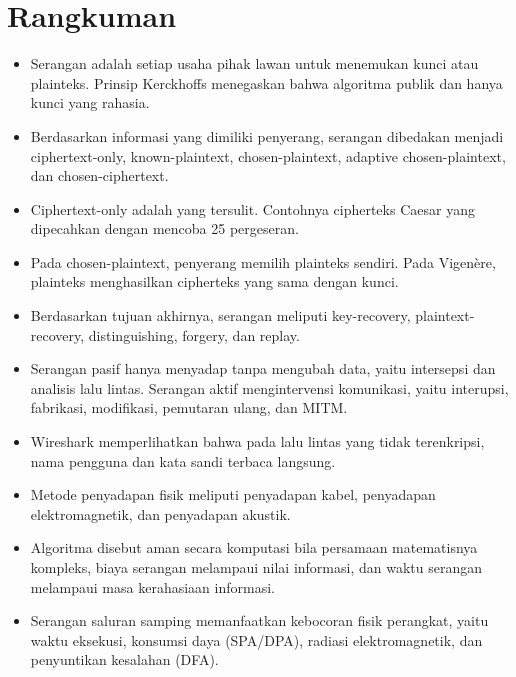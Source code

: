 \section{Rangkuman}
\begin{itemize}
    \item Serangan adalah setiap usaha pihak lawan untuk menemukan kunci atau
          plainteks. Prinsip Kerckhoffs menegaskan bahwa algoritma publik dan
          hanya kunci yang rahasia.
    \item Berdasarkan informasi yang dimiliki penyerang, serangan dibedakan
          menjadi ciphertext-only, known-plaintext, chosen-plaintext, adaptive
          chosen-plaintext, dan chosen-ciphertext.
    \item Ciphertext-only adalah yang tersulit. Contohnya cipherteks Caesar
           yang dipecahkan dengan mencoba 25 pergeseran.
    \item Pada chosen-plaintext, penyerang memilih plainteks sendiri. Pada
          Vigen\`ere, plainteks  menghasilkan cipherteks yang sama
          dengan kunci.
    \item Berdasarkan tujuan akhirnya, serangan meliputi key-recovery,
          plaintext-recovery, distinguishing, forgery, dan replay.
    \item Serangan pasif hanya menyadap tanpa mengubah data, yaitu intersepsi dan
          analisis lalu lintas. Serangan aktif mengintervensi komunikasi, yaitu
          interupsi, fabrikasi, modifikasi, pemutaran ulang, dan MITM.
    \item Wireshark memperlihatkan bahwa pada lalu lintas yang tidak terenkripsi,
          nama pengguna dan kata sandi terbaca langsung.
    \item Metode penyadapan fisik meliputi penyadapan kabel, penyadapan
          elektromagnetik, dan penyadapan akustik.
    \item Algoritma disebut aman secara komputasi bila persamaan matematisnya
          kompleks, biaya serangan melampaui nilai informasi, dan waktu serangan
          melampaui masa kerahasiaan informasi.
    \item Serangan saluran samping memanfaatkan kebocoran fisik perangkat, yaitu
          waktu eksekusi, konsumsi daya (SPA/DPA), radiasi elektromagnetik, dan
          penyuntikan kesalahan (DFA).
\end{itemize}
